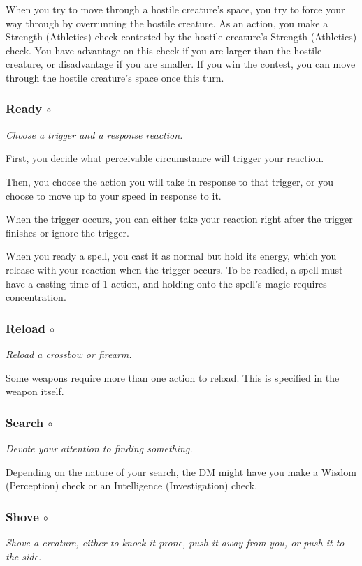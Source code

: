    When you try to move through a hostile creature's space, you try to force your way through by overrunning the hostile creature.
    As an action, you make a Strength (Athletics) check contested by the hostile creature's Strength (Athletics) check.
    You have advantage on this check if you are larger than the hostile creature, or disadvantage if you are smaller.
    If you win the contest, you can move through the hostile creature's space once this turn.
\subsubsection{Ready $\circ$}
    \textit{Choose a trigger and a response reaction.}

    First, you decide what perceivable circumstance will trigger your reaction.

    Then, you choose the action you will take in response to that trigger, or you choose to move up to your speed in response to it.

    When the trigger occurs, you can either take your reaction right after the trigger finishes or ignore the trigger.

    When you ready a spell, you cast it as normal but hold its energy, which you release with your reaction when the trigger occurs.
    To be readied, a spell must have a casting time of 1 action, and holding onto the spell's magic requires concentration.
\subsubsection{Reload $\circ$}
    \textit{Reload a crossbow or firearm.}

    Some weapons require more than one action to reload.
    This is specified in the weapon itself.
\subsubsection{Search $\circ$}
    \textit{Devote your attention to finding something.}

    Depending on the nature of your search, the DM might have you make a Wisdom (Perception) check or an Intelligence (Investigation) check.
\subsubsection{Shove $\circ$}
    \textit{Shove a creature, either to knock it prone, push it away from you, or push it to the side.}

